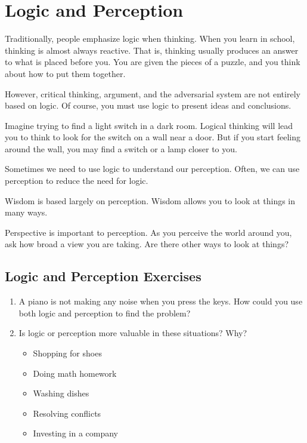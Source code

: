 \chapter{Logic and Perception}

Traditionally, people emphasize logic when thinking. When you learn in school, thinking is almost always reactive. That is, thinking usually produces an answer to what is placed before you. You are given the pieces of a puzzle, and you think about how to put them together.

However, critical thinking, argument, and the adversarial system are not entirely based on logic. Of course, you must use logic to present ideas and conclusions.

Imagine trying to find a light switch in a dark room. Logical thinking will lead you to think to look for the switch on a wall near a door. But if you start feeling around the wall, you may find a switch or a lamp closer to you.

Sometimes we need to use logic to understand our perception. Often, we can use perception to reduce the need for logic.


Wisdom is based largely on perception. Wisdom allows you to look at things in many ways.

Perspective is important to perception. As you perceive the world around you, ask how broad a view you are taking. Are there other ways to look at things?

\section*{Logic and Perception Exercises}

\begin{enumerate}
	\item A piano is not making any noise when you press the keys. How could you use both logic and perception to find the problem?
	\item Is logic or perception more valuable in these situations? Why?
	\begin{itemize}
		\item Shopping for shoes
		\item Doing math homework
		\item Washing dishes
		\item Resolving conflicts
		\item Investing in a company
	\end{itemize}
\end{enumerate}


